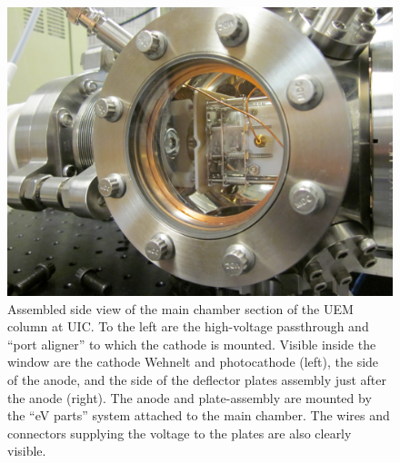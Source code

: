   \begin{figure}
    \centering
    \includegraphics{chamber.jpg}
    \caption[Side view of main chamber]{
      Assembled side view of the main chamber section of the UEM column at UIC.
      To the left are the high-voltage passthrough and ``port aligner'' to which the cathode is mounted.
      Visible inside the window are the cathode Wehnelt and photocathode (left), the side of the anode, and the side of the deflector plates assembly just after the anode (right).
      The anode and plate-assembly are mounted by the ``eV parts'' system attached to the main chamber.
      The wires and connectors supplying the voltage to the plates are also clearly visible.
    }
    \label{fig:chamber-pic}
  \end{figure}

